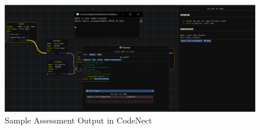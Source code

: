 \begin{figure}[H]
	\centering
	\captionsetup{justification=centering}
	\captionsetup[figure]{list=yes}
	\includegraphics[width=\linewidth]{media/sc_assessments_run.png}
	\caption[Sample Assessment Output in CodeNect]{Sample Assessment Output in CodeNect}
	\label{fig:cn_assessment_run}
\end{figure}
